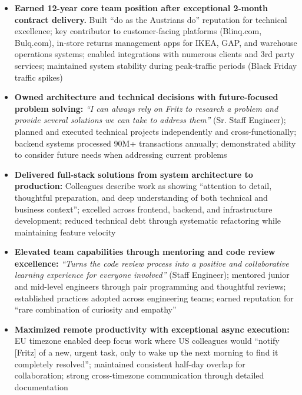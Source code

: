 \documentclass[11pt,a4paper,roman]{moderncv}
\begin{document}
\begin{itemize}[leftmargin=\dimexpr\hintscolumnwidth+\separatorcolumnwidth\relax,itemsep=0pt,topsep=0.35em]
\item \textbf{Earned 12-year core team position after exceptional 2-month contract delivery.} Built ``do as the Austrians do'' reputation for technical excellence; key contributor to customer-facing platforms (Blinq.com, Bulq.com), in-store returns management apps for IKEA, GAP, and warehouse operations systems; enabled integrations with numerous clients and 3rd party services; maintained system stability during peak-traffic periods (Black Friday traffic spikes)

\item \textbf{Owned architecture and technical decisions with future-focused problem solving:} \textit{``I can always rely on Fritz to research a problem and provide several solutions we can take to address them''} (Sr. Staff Engineer); planned and executed technical projects independently and cross-functionally; backend systems processed 90M+ transactions annually; demonstrated ability to consider future needs when addressing current problems

\item \textbf{Delivered full-stack solutions from system architecture to production:} Colleagues describe work as showing ``attention to detail, thoughtful preparation, and deep understanding of both technical and business context''; excelled across frontend, backend, and infrastructure development; reduced technical debt through systematic refactoring while maintaining feature velocity

\item \textbf{Elevated team capabilities through mentoring and code review excellence:} \textit{``Turns the code review process into a positive and collaborative learning experience for everyone involved''} (Staff Engineer); mentored junior and mid-level engineers through pair programming and thoughtful reviews; established practices adopted across engineering teams; earned reputation for ``rare combination of curiosity and empathy''

\item \textbf{Maximized remote productivity with exceptional async execution:} EU timezone enabled deep focus work where US colleagues would ``notify [Fritz] of a new, urgent task, only to wake up the next morning to find it completely resolved''; maintained consistent half-day overlap for collaboration; strong cross-timezone communication through detailed documentation


\end{itemize}
\end{document}
